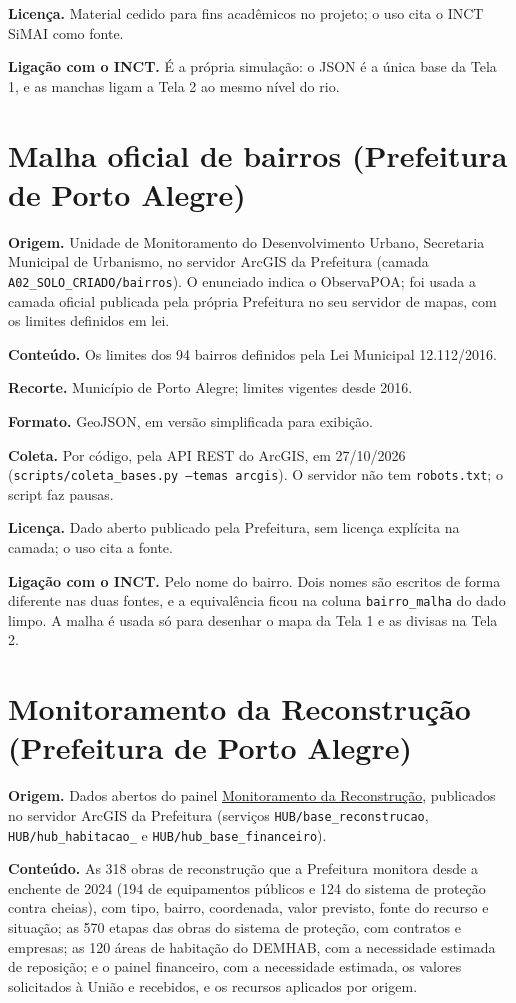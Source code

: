 \documentclass[11pt,a4paper]{article}
\newcommand{\campo}[1]{\texttt{#1}}
\begin{document}
\textbf{Licença.} Material cedido para fins acadêmicos no projeto; o uso cita o INCT SiMAI como fonte.

\textbf{Ligação com o INCT.} É a própria simulação: o JSON é a única base da Tela 1, e as manchas ligam a Tela 2 ao mesmo nível do rio.

\section{Malha oficial de bairros (Prefeitura de Porto Alegre)}

\textbf{Origem.} Unidade de Monitoramento do Desenvolvimento Urbano, Secretaria Municipal de Urbanismo, no servidor ArcGIS da Prefeitura (camada \campo{A02\_SOLO\_CRIADO/bairros}). O enunciado indica o ObservaPOA; foi usada a camada oficial publicada pela própria Prefeitura no seu servidor de mapas, com os limites definidos em lei.

\textbf{Conteúdo.} Os limites dos 94 bairros definidos pela Lei Municipal 12.112/2016.

\textbf{Recorte.} Município de Porto Alegre; limites vigentes desde 2016.

\textbf{Formato.} GeoJSON, em versão simplificada para exibição.

\textbf{Coleta.} Por código, pela API REST do ArcGIS, em 27/10/2026 (\campo{scripts/coleta\_bases.py --temas arcgis}). O servidor não tem \campo{robots.txt}; o script faz pausas.

\textbf{Licença.} Dado aberto publicado pela Prefeitura, sem licença explícita na camada; o uso cita a fonte.

\textbf{Ligação com o INCT.} Pelo nome do bairro. Dois nomes são escritos de forma diferente nas duas fontes, e a equivalência ficou na coluna \campo{bairro\_malha} do dado limpo. A malha é usada só para desenhar o mapa da Tela 1 e as divisas na Tela 2.

\section{Monitoramento da Reconstrução (Prefeitura de Porto Alegre)}

\textbf{Origem.} Dados abertos do painel \href{https://prefeitura.poa.br/monitoramento-reconstrucao}{Monitoramento da Reconstrução}, publicados no servidor ArcGIS da Prefeitura (serviços \campo{HUB/base\_reconstrucao}, \campo{HUB/hub\_habitacao\_} e \campo{HUB/hub\_base\_financeiro}).

\textbf{Conteúdo.} As 318 obras de reconstrução que a Prefeitura monitora desde a enchente de 2024 (194 de equipamentos públicos e 124 do sistema de proteção contra cheias), com tipo, bairro, coordenada, valor previsto, fonte do recurso e situação; as 570 etapas das obras do sistema de proteção, com contratos e empresas; as 120 áreas de habitação do DEMHAB, com a necessidade estimada de reposição; e o painel financeiro, com a necessidade estimada, os valores solicitados à União e recebidos, e os recursos aplicados por origem.
\end{document}
